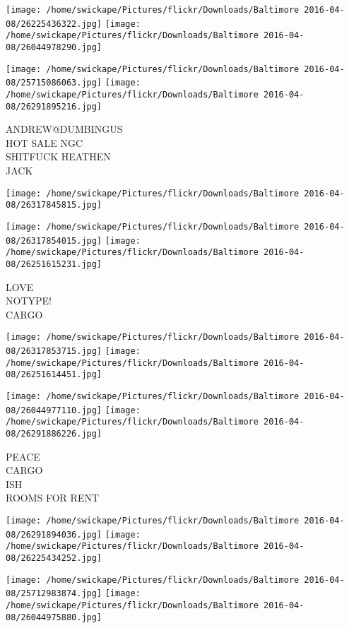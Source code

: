 \documentclass[10pt,letterpaper]{article}
\begin{document}
\texttt{[image: /home/swickape/Pictures/flickr/Downloads/Baltimore 2016-04-08/26225436322.jpg]}
\texttt{[image: /home/swickape/Pictures/flickr/Downloads/Baltimore 2016-04-08/26044978290.jpg]}

\texttt{[image: /home/swickape/Pictures/flickr/Downloads/Baltimore 2016-04-08/25715086063.jpg]}
\texttt{[image: /home/swickape/Pictures/flickr/Downloads/Baltimore 2016-04-08/26291895216.jpg]}

ANDREW@DUMBINGUS\\
HOT SALE NGC\\
SHITFUCK HEATHEN\\
JACK
\pagebreak

\texttt{[image: /home/swickape/Pictures/flickr/Downloads/Baltimore 2016-04-08/26317845815.jpg]}

\vspace{0.25in}
\texttt{[image: /home/swickape/Pictures/flickr/Downloads/Baltimore 2016-04-08/26317854015.jpg]}
\texttt{[image: /home/swickape/Pictures/flickr/Downloads/Baltimore 2016-04-08/26251615231.jpg]}

LOVE\\
NOTYPE!\\
CARGO
\pagebreak

\texttt{[image: /home/swickape/Pictures/flickr/Downloads/Baltimore 2016-04-08/26317853715.jpg]}
\texttt{[image: /home/swickape/Pictures/flickr/Downloads/Baltimore 2016-04-08/26251614451.jpg]}

\texttt{[image: /home/swickape/Pictures/flickr/Downloads/Baltimore 2016-04-08/26044977110.jpg]}
\texttt{[image: /home/swickape/Pictures/flickr/Downloads/Baltimore 2016-04-08/26291886226.jpg]}

PEACE\\
CARGO\\
ISH\\
ROOMS FOR RENT
\pagebreak

\texttt{[image: /home/swickape/Pictures/flickr/Downloads/Baltimore 2016-04-08/26291894036.jpg]}
\texttt{[image: /home/swickape/Pictures/flickr/Downloads/Baltimore 2016-04-08/26225434252.jpg]}

\texttt{[image: /home/swickape/Pictures/flickr/Downloads/Baltimore 2016-04-08/25712983874.jpg]}
\texttt{[image: /home/swickape/Pictures/flickr/Downloads/Baltimore 2016-04-08/26044975880.jpg]}
\end{document}
